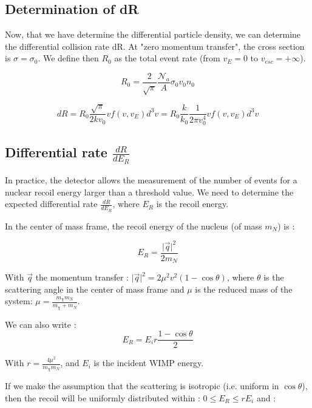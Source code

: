 \documentclass[a4paper, twoside, openany, 11pt]{book}
\begin{document}
\subsection{Determination of dR}
Now, that we have determine the differential particle density, we can determine the differential collision rate dR.
At "zero momentum transfer", the cross section is $\sigma = \sigma_0$.
We define then $R_0$ as the total event rate (from $v_E =0$ to $v_{esc}=+\infty$). 

\begin{equation}
R_0 = \frac{2}{\sqrt{\pi}} \frac{\mathcal{N}_a}{A}\sigma_0 v_0 n_0
\end{equation}

\begin{equation}
\label{eq:dRfinal}
\boxed{ dR = R_0\frac{\sqrt{\pi}}{2 k v_0} v f(v,v_E) d^3v = R_0\frac{k}{k_0} \frac{1}{2\pi v_0^4} v f(v,v_E) d^3v }
\end{equation}


\subsection{Differential rate $\frac{dR}{dE_R}$}

In practice, the detector allows the measurement of the number of events for a nuclear recoil energy larger than a threshold value. We need to determine the expected differential rate $\frac{dR}{dE_R}$, where $E_R$ is the recoil energy.

In the center of mass frame, the recoil energy of the nucleus (of mass $m_N$) is : 

\begin{equation}
E_R=\frac{\vert \vec{q} \vert^2}{2m_N}
\end{equation}

With $\vec{q}$ the momentum transfer : $\vert \vec{q} \vert^2 = 2 \mu^2 v^2 (1- \cos \theta)$, where $\theta$ is the scattering angle in the center of mass frame and $\mu$ is the reduced mass of the system: 
$\mu = \frac{m_\chi m_N}{m_\chi + m_N}$. 

We can also write : 
\begin{equation*}
E_R=E_i r \frac{1-\cos \theta}{2}
\end{equation*}

With $r= \frac{4\mu^2}{m_\chi m_N}$, and $E_i$ is the incident WIMP energy.

If we make the assumption that the scattering is isotropic (i.e. uniform in $\cos \theta$), then the recoil will be uniformly distributed within : $ 0 \leq E_R \leq r E_i $ and :
\end{document}
